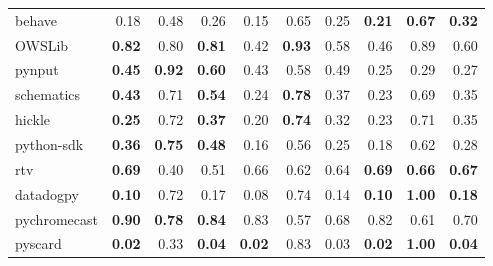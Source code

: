 \documentclass[submit,noauthor,ses,dvipdfmx]{ipsj}
\begin{document}
\begin{table}[t]
{\begin{tabular}{l|rrr|rrr|rrr}
    behave & \multicolumn{1}{r|}{0.18} & \multicolumn{1}{r|}{0.48} & 0.26 & \multicolumn{1}{r|}{0.15} & \multicolumn{1}{r|}{0.65} & 0.25 & \multicolumn{1}{r|}{\textbf{0.21}} & \multicolumn{1}{r|}{\textbf{0.67}} & \textbf{0.32} \\
    OWSLib & \multicolumn{1}{r|}{\textbf{0.82}} & \multicolumn{1}{r|}{0.80} & \textbf{0.81} & \multicolumn{1}{r|}{0.42} & \multicolumn{1}{r|}{\textbf{0.93}} & 0.58 & \multicolumn{1}{r|}{0.46} & \multicolumn{1}{r|}{0.89} & 0.60 \\
    pynput & \multicolumn{1}{r|}{\textbf{0.45}} & \multicolumn{1}{r|}{\textbf{0.92}} & \textbf{0.60} & \multicolumn{1}{r|}{0.43} & \multicolumn{1}{r|}{0.58} & 0.49 & \multicolumn{1}{r|}{0.25} & \multicolumn{1}{r|}{0.29} & 0.27 \\
    schematics & \multicolumn{1}{r|}{\textbf{0.43}} & \multicolumn{1}{r|}{0.71} & \textbf{0.54} & \multicolumn{1}{r|}{0.24} & \multicolumn{1}{r|}{\textbf{0.78}} & 0.37 & \multicolumn{1}{r|}{0.23} & \multicolumn{1}{r|}{0.69} & 0.35 \\
    hickle & \multicolumn{1}{r|}{\textbf{0.25}} & \multicolumn{1}{r|}{0.72} & \textbf{0.37} & \multicolumn{1}{r|}{0.20} & \multicolumn{1}{r|}{\textbf{0.74}} & 0.32 & \multicolumn{1}{r|}{0.23} & \multicolumn{1}{r|}{0.71} & 0.35 \\
    python-sdk & \multicolumn{1}{r|}{\textbf{0.36}} & \multicolumn{1}{r|}{\textbf{0.75}} & \textbf{0.48} & \multicolumn{1}{r|}{0.16} & \multicolumn{1}{r|}{0.56} & 0.25 & \multicolumn{1}{r|}{0.18} & \multicolumn{1}{r|}{0.62} & 0.28 \\
    rtv & \multicolumn{1}{r|}{\textbf{0.69}} & \multicolumn{1}{r|}{0.40} & 0.51 & \multicolumn{1}{r|}{0.66} & \multicolumn{1}{r|}{0.62} & 0.64 & \multicolumn{1}{r|}{\textbf{0.69}} & \multicolumn{1}{r|}{\textbf{0.66}} & \textbf{0.67} \\
    datadogpy & \multicolumn{1}{r|}{\textbf{0.10}} & \multicolumn{1}{r|}{0.72} & 0.17 & \multicolumn{1}{r|}{0.08} & \multicolumn{1}{r|}{0.74} & 0.14 & \multicolumn{1}{r|}{\textbf{0.10}} & \multicolumn{1}{r|}{\textbf{1.00}} & \textbf{0.18} \\
    pychromecast & \multicolumn{1}{r|}{\textbf{0.90}} & \multicolumn{1}{r|}{\textbf{0.78}} & \textbf{0.84} & \multicolumn{1}{r|}{0.83} & \multicolumn{1}{r|}{0.57} & 0.68 & \multicolumn{1}{r|}{0.82} & \multicolumn{1}{r|}{0.61} & 0.70 \\
    pyscard & \multicolumn{1}{r|}{\textbf{0.02}} & \multicolumn{1}{r|}{0.33} & \textbf{0.04} & \multicolumn{1}{r|}{\textbf{0.02}} & \multicolumn{1}{r|}{0.83} & 0.03 & \multicolumn{1}{r|}{\textbf{0.02}} & \multicolumn{1}{r|}{\textbf{1.00}} & \textbf{0.04} \\

\end{tabular}}
\end{table}
\end{document}
